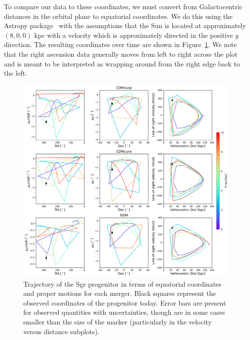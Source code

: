 To compare our data to these coordinates, we must convert from Galactocentric
distances in the orbital plane to equatorial coordinates.  We do this using the
Astropy package~\cite{astropy_collaboration_astropy_2013,
astropy_collaboration_astropy_2018} with the assumptions that the Sun is
located at approximately $(8,0,0)$ kpc with a velocity which is approximately
directed in the positive $y$ direction.  The resulting coordinates over time
are shown in Figure~\ref{fig:eq_prog}.  We note that the right ascension data
generally moves from left to right across the plot and is meant to be
interpreted as wrapping around from the right edge back to the left.

\begin{figure}
    \centering
    \includegraphics[width=1.0\linewidth]{figs/equatorial_progenitor.pdf}
    \caption{%
        Trajectory of the Sgr progenitor in terms of equatorial coordinates and
        proper motions for each merger. Black squares represent the observed
        coordinates of the progenitor today. Error bars are present for observed
        quantities with uncertainties, though are in some cases smaller than
        the size of the marker (particularly in the velocity versus distance
        subplots).
    }
    \label{fig:eq_prog}
\end{figure}

